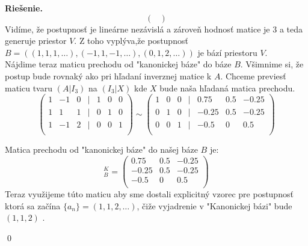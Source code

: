 \documentclass{article}
\theoremstyle{definition}
\theoremstyle{plain}
\newenvironment{solution}{\noindent\textbf{Riešenie.}\hspace{0.5em}}{\hfill\qed\medskip}
\begin{document}
\begin{solution}
\begin{equation*}
\begin{pmatrix}
    \end{pmatrix}
\end{equation*}
Vidíme, že postupnosť je lineárne nezávislá a zároveň hodnosť matice je $3$ a teda generuje priestor $V$. Z toho vyplýva,že postupnosť \\$B =((1,1,1,\dots),(-1,1,-1,\dots),(0,1,2,\dots))$ je bází priestoru $V$.\\
Nájdime teraz maticu prechodu od "kanonickej báze" do báze $B$. Všimnime si, že postup bude rovnaký ako pri hľadaní inverznej matice k $A$. Chceme previesť maticu tvaru $(A|I_3)$ na $(I_3|X)$ kde $X$ bude naša hľadaná matica prechodu.
\begin{equation*}
        \begin{pmatrix}
        1 & -1 & 0 &|& 1 & 0 &0\\
        1 & 1 & 1  &|& 0 & 1 &0\\
        1 & -1 & 2&|& 0 & 0 &1\\

    \end{pmatrix}
    \sim 
    \begin{pmatrix}
        1 & 0 & 0&|& 0.75 & 0.5 &-0.25\\
        0 & 1 & 0&|& -0.25 &0.5 &-0.25\\
        0 & 0 & 1&|& -0.5 & 0 &0.5\\

    \end{pmatrix}
\end{equation*}

Matica prechodu od "kanonickej báze" do našej báze $B$ je:
\begin{equation*}
    [\text{id}]_B^K =\begin{pmatrix}
         0.75 & 0.5 &-0.25\\
         -0.25 &0.5 &-0.25\\
         -0.5 & 0 &0.5\\
    \end{pmatrix}
\end{equation*}
Teraz využijeme túto maticu aby sme dostali explicitný vzorec pre postupnosť ktorá sa začína $\{a_n\} =(1,1,2,\dots )$, čiže vyjadrenie v "Kanonickej bázi" bude $(1,1,2)$ . 


\end{solution}
\end{document}
